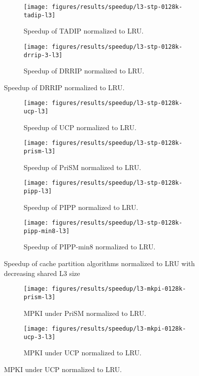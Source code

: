\begin{figure}[!htb]
    \centering
    \begin{subfigure}[b]{0.5\textwidth}
        \texttt{[image: figures/results/speedup/l3-stp-0128k-tadip-l3]}
        \caption{Speedup of TADIP normalized to LRU.}
        \label{fig:results:l3:tadip}
    \end{subfigure}%
    \begin{subfigure}[b]{0.5\textwidth}
        \texttt{[image: figures/results/speedup/l3-stp-0128k-drrip-3-l3]}
        \caption{Speedup of DRRIP normalized to LRU.}
        \label{fig:results:l3:drrip}
    \end{subfigure}
\end{figure}
\clearpage
\begin{figure}[!htb]
    \ContinuedFloat
    \begin{subfigure}[b]{0.5\textwidth}
        \texttt{[image: figures/results/speedup/l3-stp-0128k-ucp-l3]}
        \caption{Speedup of UCP normalized to LRU.}
        \label{fig:results:l3:ucp}
    \end{subfigure}%
    \begin{subfigure}[b]{0.5\textwidth}
        \texttt{[image: figures/results/speedup/l3-stp-0128k-prism-l3]}
        \caption{Speedup of PriSM normalized to LRU.}
        \label{fig:results:l3:prism}
    \end{subfigure}
    \begin{subfigure}[b]{0.5\textwidth}
        \texttt{[image: figures/results/speedup/l3-stp-0128k-pipp-l3]}
        \caption{Speedup of PIPP normalized to LRU.}
        \label{fig:results:l3:pipp}
    \end{subfigure}%
    \begin{subfigure}[b]{0.5\textwidth}
        \texttt{[image: figures/results/speedup/l3-stp-0128k-pipp-min8-l3]}
        \caption{Speedup of PIPP-min8 normalized to LRU.}
        \label{fig:results:l3:pipp-min8}
    \end{subfigure}
    \caption{Speedup of cache partition algorithms normalized to LRU with decreasing shared L3 size}
    \label{fig:results:l3}
\end{figure}

\begin{figure}[!htb]
    \centering
    \begin{subfigure}[b]{0.5\textwidth}
        \texttt{[image: figures/results/speedup/l3-mkpi-0128k-prism-l3]}
        \caption{MPKI under PriSM normalized to LRU.}
        \label{fig:results:l3:mpki-prism}
    \end{subfigure}%
    \begin{subfigure}[b]{0.5\textwidth}
        \texttt{[image: figures/results/speedup/l3-mkpi-0128k-ucp-3-l3]}
        \caption{MPKI under UCP normalized to LRU.}
        \label{fig:results:l3:mpki-ucp}
    \end{subfigure}
\end{figure}

